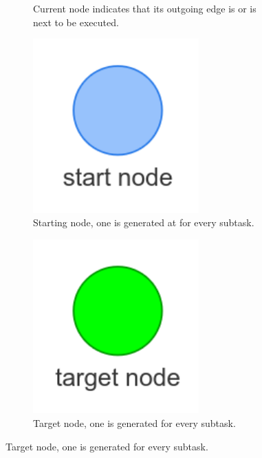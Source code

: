 \begin{figure}[H]
\begin{subfigure}{0.2\textwidth}
    \caption{Current node indicates that its outgoing edge is or is next to be executed.}%
    \end{subfigure}
    \begin{subfigure}{0.2\textwidth}
    \centering
    \includegraphics[width=0.7\textwidth]{figures/proposed_method/connecting_nodes/legend/starting_node}
    \caption{Starting node, one is generated at for every subtask.}%
    \end{subfigure}
    \begin{subfigure}{0.2\textwidth}
    \centering
    \includegraphics[width=0.7\textwidth]{figures/proposed_method/connecting_nodes/legend/target_node}
    \caption{Target node, one is generated for every subtask.\newline}%
    \end{subfigure}


\end{figure}
